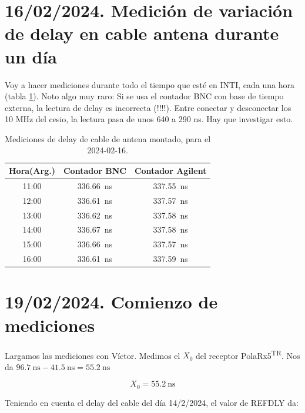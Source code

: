 \documentclass[11pt]{article}
\newcommand{\polar}[0]{PolaRx5\textsuperscript{TR}}
\begin{document}
\section{16/02/2024. Medición de variación de delay en cable antena durante un día}

Voy a hacer mediciones durante todo el tiempo que esté en INTI, cada una hora (tabla \ref{tab:delayTodoUnDia}). Noto algo muy raro: Si se usa el contador BNC con base de tiempo externa, la lectura de delay es incorrecta (!!!!). Entre conectar y desconectar los 10 MHz del cesio, la lectura pasa de unos 640 a 290 ns. Hay que investigar esto.


\begin{table}[ht]
    \centering
    \begin{tabular}{|c||c|c|}
        \hline
        Hora(Arg.) & Contador BNC  & Contador Agilent\\
        \hline
        11:00 & \SI{336.66}{\nano\second} & \SI{337.55}{\nano\second}  \\
        12:00 & \SI{336.61}{\nano\second} & \SI{337.57}{\nano\second}  \\
        13:00 & \SI{336.62}{\nano\second} & \SI{337.58}{\nano\second}  \\
        14:00 & \SI{336.67}{\nano\second} & \SI{337.58}{\nano\second}  \\
        15:00 & \SI{336.66}{\nano\second} & \SI{337.57}{\nano\second}  \\
        16:00 & \SI{336.61}{\nano\second} & \SI{337.59}{\nano\second}  \\

        \hline
    \end{tabular}
        \caption{Mediciones de delay de cable de antena montado, para el 2024-02-16. }
    \label{tab:delayTodoUnDia}
\end{table}

\section{19/02/2024. Comienzo de mediciones}
Largamos las mediciones con Víctor. Medimos el $X_0$ del receptor \polar. Nos da $\SI{96.7}{\nano\second}-\SI{41.5}{\nano\second}=\SI{55.2}{\nano\second}$

\begin{equation}
\boxed{X_0=\SI{55.2}{\nano\second}}\label{eq:X0} 
\end{equation}

Teniendo en cuenta el delay del cable del día 14/2/2024, el valor de REFDLY da:
\end{document}
